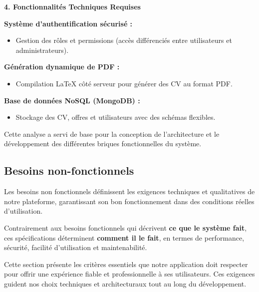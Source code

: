 \documentclass{report}
\begin{document}
\par

\textbf{4. Fonctionnalités Techniques Requises}

\textbf{Système d'authentification sécurisé :}
\begin{itemize}
    \item Gestion des rôles et permissions (accès différenciés entre utilisateurs et administrateurs).
\end{itemize}

\textbf{Génération dynamique de PDF :}
\begin{itemize}
    \item Compilation LaTeX côté serveur pour générer des CV au format PDF.
\end{itemize}

\textbf{Base de données NoSQL (MongoDB) :}
\begin{itemize}
    \item Stockage des CV, offres et utilisateurs avec des schémas flexibles.
\end{itemize}

\par

Cette analyse a servi de base pour la conception de l'architecture et le développement des différentes briques fonctionnelles du système.

\subsection{Besoins non-fonctionnels}

Les besoins non fonctionnels définissent les exigences techniques et qualitatives de notre plateforme, garantissant son bon fonctionnement dans des conditions réelles d'utilisation.

\par

Contrairement aux besoins fonctionnels qui décrivent \textbf{ce que le système fait}, ces spécifications déterminent \textbf{comment il le fait}, en termes de performance, sécurité, facilité d'utilisation et maintenabilité.

\par

Cette section présente les critères essentiels que notre application doit respecter pour offrir une expérience fiable et professionnelle à ses utilisateurs. Ces exigences guident nos choix techniques et architecturaux tout au long du développement.

\par
\end{document}
